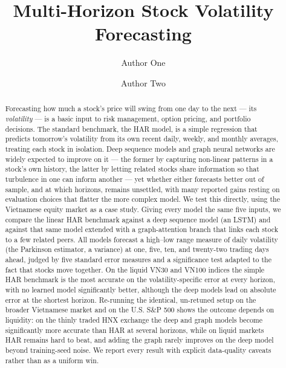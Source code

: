 \documentclass[runningheads]{llncs}
\begin{document}
\title{Multi-Horizon Stock Volatility Forecasting}

\author{Author One \and Author Two}

\maketitle

\begin{abstract}
Forecasting how much a stock's price will swing from one day to the next --- its \emph{volatility} --- is a
basic input to risk management, option pricing, and portfolio decisions. The standard benchmark, the HAR model,
is a simple regression that predicts tomorrow's volatility from its own recent daily, weekly, and monthly
averages, treating each stock in isolation. Deep sequence models and graph neural networks are widely expected
to improve on it --- the former by capturing non-linear patterns in a stock's own history, the latter by letting
related stocks share information so that turbulence in one can inform another --- yet whether either forecasts
better out of sample, and at which horizons, remains unsettled, with many reported gains resting on evaluation
choices that flatter the more complex model.
We test this directly, using the Vietnamese equity market as a case study. Giving every model the same five
inputs, we compare the linear HAR benchmark against a deep sequence model (an LSTM) and against that same model
extended with a graph-attention branch that links each stock to a few related peers. All models forecast a
high--low range measure of daily volatility (the Parkinson estimator, a variance) at one, five, ten, and
twenty-two trading days ahead, judged by five standard error measures and a significance test adapted to the
fact that stocks move together. On the liquid VN30 and VN100 indices the simple HAR benchmark is the most
accurate on the volatility-specific error at every horizon, with no learned model significantly better, although
the deep models lead on absolute error at the shortest horizon. Re-running the identical, un-retuned setup on the
broader Vietnamese market and on the U.S. S\&P 500 shows the outcome depends on liquidity: on the thinly traded
HNX exchange the deep and graph models become significantly more accurate than HAR at several horizons, while on
liquid markets HAR remains hard to beat, and adding the graph rarely improves on the deep model beyond
training-seed noise. We report every result with explicit data-quality caveats rather than as a uniform win.
\end{abstract}
\end{document}
